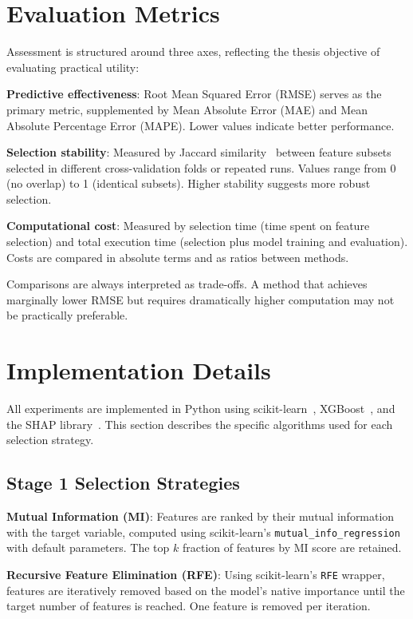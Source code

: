 \section{Evaluation Metrics}

Assessment is structured around three axes, reflecting the thesis objective of evaluating practical utility:

\textbf{Predictive effectiveness}: Root Mean Squared Error (RMSE) serves as the primary metric, supplemented by Mean Absolute Error (MAE) and Mean Absolute Percentage Error (MAPE). Lower values indicate better performance.

\textbf{Selection stability}: Measured by Jaccard similarity~\cite{Nogueira2018Stability} between feature subsets selected in different cross-validation folds or repeated runs. Values range from 0 (no overlap) to 1 (identical subsets). Higher stability suggests more robust selection.

\textbf{Computational cost}: Measured by selection time (time spent on feature selection) and total execution time (selection plus model training and evaluation). Costs are compared in absolute terms and as ratios between methods.

Comparisons are always interpreted as trade-offs. A method that achieves marginally lower RMSE but requires dramatically higher computation may not be practically preferable.

\section{Implementation Details}

All experiments are implemented in Python using scikit-learn~\cite{pedregosa2011scikit}, XGBoost~\cite{chen2016xgboost}, and the SHAP library~\cite{Lundblundberg2018shapergSHAP}. This section describes the specific algorithms used for each selection strategy.

\subsection{Stage 1 Selection Strategies}

\textbf{Mutual Information (MI)}: Features are ranked by their mutual information with the target variable, computed using scikit-learn's \texttt{mutual\_info\_regression}~\cite{guyon2003introduction} with default parameters. The top $k$ fraction of features by MI score are retained.

\textbf{Recursive Feature Elimination (RFE)}: Using scikit-learn's \texttt{RFE} wrapper, features are iteratively removed based on the model's native importance until the target number of features is reached. One feature is removed per iteration.

